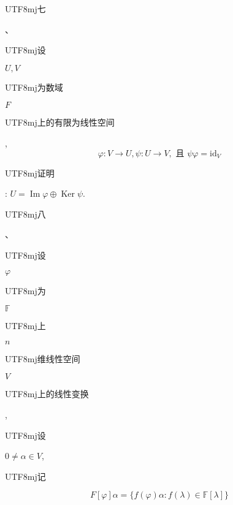 \documentclass[10pt]{article}
\begin{document}
\begin{CJK}{UTF8}{mj}七\end{CJK}、\begin{CJK}{UTF8}{mj}设\end{CJK} $U, V$ \begin{CJK}{UTF8}{mj}为数域\end{CJK} $F$ \begin{CJK}{UTF8}{mj}上的有限为线性空间\end{CJK},
$$
\varphi: V \rightarrow U, \psi: U \rightarrow V, \text { 且 } \psi \varphi=\mathrm{id}_{V}
$$
\begin{CJK}{UTF8}{mj}证明\end{CJK}: $U=\operatorname{Im} \varphi \oplus \operatorname{Ker} \psi$.

\begin{CJK}{UTF8}{mj}八\end{CJK}、\begin{CJK}{UTF8}{mj}设\end{CJK} $\varphi$ \begin{CJK}{UTF8}{mj}为\end{CJK} $\mathbb{F}$ \begin{CJK}{UTF8}{mj}上\end{CJK} $n$ \begin{CJK}{UTF8}{mj}维线性空间\end{CJK} $V$ \begin{CJK}{UTF8}{mj}上的线性变换\end{CJK}, \begin{CJK}{UTF8}{mj}设\end{CJK} $0 \neq \alpha \in V$, \begin{CJK}{UTF8}{mj}记\end{CJK}
$$
F[\varphi] \alpha=\{f(\varphi) \alpha: f(\lambda) \in \mathbb{F}[\lambda]\}
$$
\end{document}
